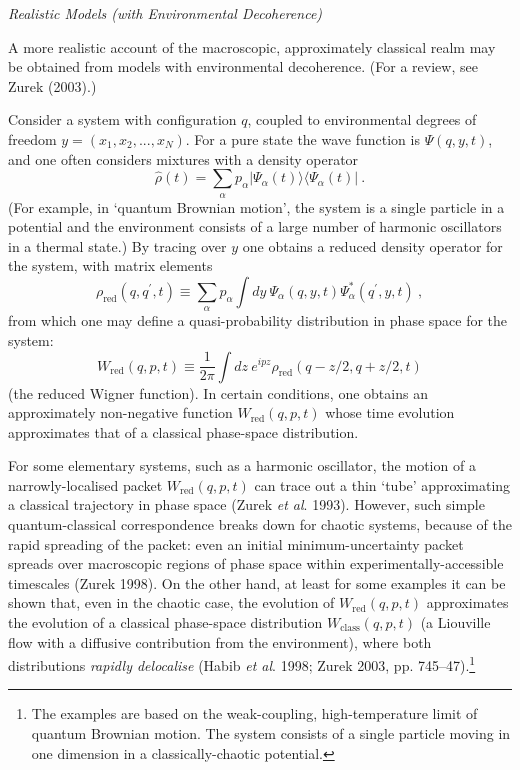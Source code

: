 \documentclass[12pt]{article}%
\begin{document}
\begin{center}
\textit{Realistic Models (with Environmental Decoherence)}
\end{center}

A more realistic account of the macroscopic, approximately classical realm may
be obtained from models with environmental decoherence. (For a review, see
Zurek (2003).)

Consider a system with configuration $q$, coupled to environmental degrees of
freedom $y=(x_{1},x_{2},...,x_{N})$. For a pure state the wave function is
$\Psi(q,y,t)$, and one often considers mixtures with a density operator%
\[
\hat{\rho}(t)=\sum_{\alpha}p_{\alpha}|\Psi_{\alpha}(t)\rangle\langle
\Psi_{\alpha}(t)|\ .
\]
(For example, in `quantum Brownian motion', the system is a single particle in
a potential and the environment consists of a large number of harmonic
oscillators in a thermal state.) By tracing over $y$ one obtains a reduced
density operator for the system, with matrix elements%
\[
\rho_{\mathrm{red}}(q,q^{\prime},t)\equiv\sum_{\alpha}p_{\alpha}\int
dy\ \Psi_{\alpha}(q,y,t)\Psi_{\alpha}^{\ast}(q^{\prime},y,t)\ ,
\]
from which one may define a quasi-probability distribution in phase space for
the system:%
\[
W_{\mathrm{red}}(q,p,t)\equiv\frac{1}{2\pi}\int dz\ e^{ipz}\rho_{\mathrm{red}%
}(q-z/2,q+z/2,t)
\]
(the reduced Wigner function). In certain conditions, one obtains an
approximately non-negative function $W_{\mathrm{red}}(q,p,t)$ whose time
evolution approximates that of a classical phase-space distribution.

For some elementary systems, such as a harmonic oscillator, the motion of a
narrowly-localised packet $W_{\mathrm{red}}(q,p,t)$ can trace out a thin
`tube' approximating a classical trajectory in phase space (Zurek \textit{et
al}. 1993). However, such simple quantum-classical correspondence breaks down
for chaotic systems, because of the rapid spreading of the packet: even an
initial minimum-uncertainty packet spreads over macroscopic regions of phase
space within experimentally-accessible timescales (Zurek 1998). On the other
hand, at least for some examples it can be shown that, even in the chaotic
case, the evolution of $W_{\mathrm{red}}(q,p,t)$ approximates the evolution of
a classical phase-space distribution $W_{\mathrm{class}}(q,p,t)$ (a Liouville
flow with a diffusive contribution from the environment), where both
distributions \textit{rapidly delocalise} (Habib \textit{et al}. 1998; Zurek
2003, pp. 745--47).\footnote{The examples are based on the weak-coupling,
high-temperature limit of quantum Brownian motion. The system consists of a
single particle moving in one dimension in a classically-chaotic potential.}
\end{document}
